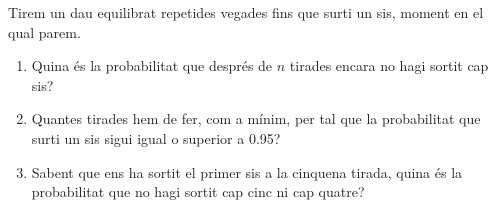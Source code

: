 \item Tirem un dau equilibrat repetides vegades fins que surti un sis, moment en el qual parem.
\begin{enumerate}
    \item Quina és la probabilitat que després de $n$ tirades encara no hagi sortit cap sis?
    \item Quantes tirades hem de fer, com a mínim, per tal que la probabilitat que surti un sis sigui igual o superior a 0.95?
    \item Sabent que ens ha sortit el primer sis a la cinquena tirada, quina és la probabilitat que no hagi sortit cap cinc ni cap quatre?
\end{enumerate}

